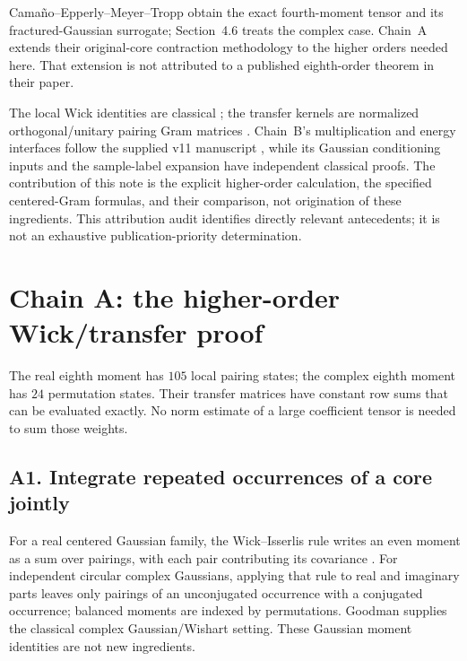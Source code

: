 \documentclass[11pt]{article}
\numberwithin{equation}{section}
\theoremstyle{definition}\newtheorem{definition}[theorem]{Definition}
\theoremstyle{remark}\newtheorem{remark}[theorem]{Remark}
\begin{document}
Cama\~no--Epperly--Meyer--Tropp
\cite[Section~4.4.1, equation~(4.8), and Theorems~4.3--4.4]{CEMT}
obtain the exact fourth-moment tensor and its fractured-Gaussian surrogate;
Section~4.6 treats the complex case. Chain~A extends their original-core
contraction methodology to the higher orders needed here. That extension is
not attributed to a published eighth-order theorem in their paper.

The local Wick identities are classical \cite{Isserlis,Goodman}; the transfer
kernels are normalized orthogonal/unitary pairing Gram matrices
\cite[Section~2]{CollinsMatsumoto}. Chain~B's multiplication and energy interfaces
follow the supplied v11 manuscript \cite{Framework}, while its Gaussian
conditioning inputs and the sample-label expansion have independent classical
proofs. The contribution of this note is the explicit higher-order calculation,
the specified centered-Gram formulas, and their comparison, not origination of
these ingredients. This attribution audit identifies directly relevant
antecedents; it is not an exhaustive publication-priority determination.

\par{}
\section{Chain A: the higher-order Wick/transfer proof}\label{sec:A}
\begin{takeaway}
The real eighth moment has $105$ local pairing states; the complex eighth moment
has $24$ permutation states. Their transfer matrices have constant row sums that
can be evaluated exactly. No norm estimate of a large coefficient tensor is needed
to sum those weights.
\end{takeaway}

\subsection{A1. Integrate repeated occurrences of a core jointly}
For a real centered Gaussian family, the Wick--Isserlis rule writes an even
moment as a sum over pairings, with each pair contributing its covariance
\cite{Isserlis}. For independent circular complex Gaussians, applying that rule
to real and imaginary parts leaves only pairings of an unconjugated occurrence
with a conjugated occurrence; balanced moments are indexed by permutations.
Goodman \cite{Goodman} supplies the classical complex Gaussian/Wishart setting.
These Gaussian moment identities are not new ingredients.
\end{document}
